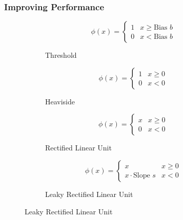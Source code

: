\subsubsection{Improving Performance}
\label{sec:mlp-improving-percofrmance}
\begin{figure}
	\setlength{}
	\setlength{}
	\centering
	\begin{subfigure}{.5\textwidth}
		\centering
		
		\begin{equation*}
			\phi(x) =
			\begin{cases}
				1 & x \geq \text{Bias $b$} \\
				0 & x < \text{Bias $b$}
			\end{cases}
		\end{equation*}
		\caption{Threshold}
		\label{fig:threshold-activation}
	\end{subfigure}%
	\hfill
	\begin{subfigure}{.5\textwidth}
		\centering
		
		\begin{equation*}
			\phi(x) =
			\begin{cases}
				1 & x \geq 0 \\
				0 & x < 0
			\end{cases}
		\end{equation*}
		\caption{Heaviside}
		\label{fig:heaviside-activation}
	\end{subfigure}
	
	\begin{subfigure}{.5\textwidth}
		\centering
		
		\begin{equation*}
			\phi(x) =
			\begin{cases}
				x & x \geq 0 \\
				0 & x < 0
			\end{cases}
		\end{equation*}
		\caption{Rectified Linear Unit}
		\label{fig:relu-activation}
	\end{subfigure}%
	\hfill
	\begin{subfigure}{.5\textwidth}
			\centering
			
			\begin{equation*}
				\phi(x) =
				\begin{cases}
					x & x \geq 0 \\
					x\cdot \text{Slope $s$} & x < 0
				\end{cases}
			\end{equation*}
			\caption{Leaky Rectified Linear Unit}
			\label{fig:leakyrelu-activation}
		\end{subfigure}
	

\end{figure}
